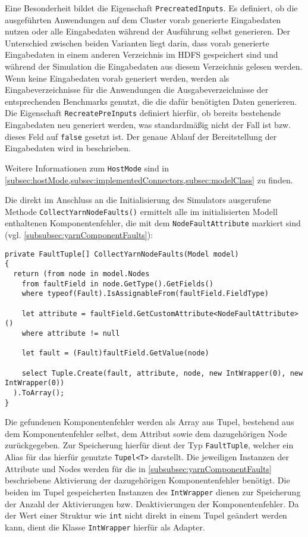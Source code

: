 Eine Besonderheit bildet die Eigenschaft \texttt{PrecreatedInputs}.
Es definiert, ob die ausgeführten Anwendungen auf dem Cluster vorab generierte Eingabedaten nutzen oder alle Eingabedaten während der Ausführung selbst generieren.
Der Unterschied zwischen beiden Varianten liegt darin, dass vorab generierte Eingabedaten in einem anderen Verzeichnis im \ac{HDFS} gespeichert sind und während der Simulation die Eingabedaten aus diesem Verzeichnis gelesen werden.
Wenn keine Eingabedaten vorab generiert werden, werden als Eingabeverzeichnisse für die Anwendungen die Ausgabeverzeichnisse der entsprechenden Benchmarks genutzt, die die dafür benötigten Daten generieren.
Die Eigenschaft \texttt{RecreatePreInputs} definiert hierfür, ob bereits bestehende Eingabedaten neu generiert werden, was standardmäßig nicht der Fall ist bzw. dieses Feld auf \texttt{false} gesetzt ist.
Der genaue Ablauf der Bereitstellung der Eingabedaten wird in  beschrieben.

Weitere Informationen zum \texttt{HostMode} sind in \cref{subsec:hostMode,subsec:implementedConnectors,subsec:modelClass} zu finden.

Die direkt im Anschluss an die Initialisierung des Simulators ausgerufene Methode \texttt{CollectYarnNodeFaults()} ermittelt alle im initialisierten Modell enthaltenen Komponentenfehler, die mit dem \texttt{NodeFaultAttribute} markiert sind (vgl. \cref{subsubsec:yarnComponentFaults}):

\begin{lstlisting}[label=lst:hadoopSimulationCollectFaults,style=cs,
caption={[Ermitteln der Komponentenfehler mit dem NodeFaultAttribute]
    Ermitteln der Komponentenfehler mit dem \texttt{NodeFaultAttribute}}]
private FaultTuple[] CollectYarnNodeFaults(Model model)
{
  return (from node in model.Nodes      
    from faultField in node.GetType().GetFields()
    where typeof(Fault).IsAssignableFrom(faultField.FieldType)
    
    let attribute = faultField.GetCustomAttribute<NodeFaultAttribute>()
    where attribute != null
    
    let fault = (Fault)faultField.GetValue(node)
    
    select Tuple.Create(fault, attribute, node, new IntWrapper(0), new IntWrapper(0))
  ).ToArray();
}
\end{lstlisting}

Die gefundenen Komponentenfehler werden als Array aus Tupel, bestehend aus dem Komponentenfehler selbst, dem Attribut sowie dem dazugehörigen Node zurückgegeben.
Zur Speicherung hierfür dient der Typ \texttt{FaultTuple}, welcher ein Alias für das hierfür genutzte \texttt{Tupel<T>} darstellt.
Die jeweiligen Instanzen der Attribute und Nodes werden für die in \cref{subsubsec:yarnComponentFaults} beschriebene Aktivierung der dazugehörigen Komponentenfehler benötigt.
Die beiden im Tupel gespeicherten Instanzen des \texttt{IntWrapper} dienen zur Speicherung der Anzahl der Aktivierungen bzw. Deaktivierungen der Komponentenfehler.
Da der Wert einer Struktur wie \texttt{int} nicht direkt in einem Tupel geändert werden kann, dient die Klasse \texttt{IntWrapper} hierfür als Adapter.

